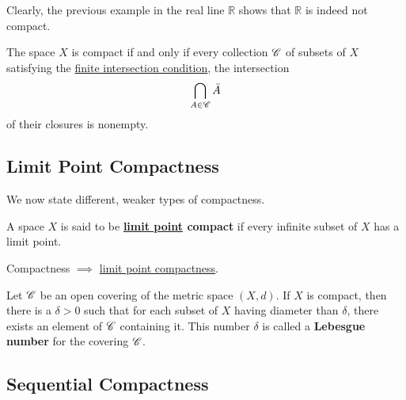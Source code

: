   Clearly, the previous example in the real line $\mathbb{R}$ shows that $\mathbb{R}$ is indeed not compact. 

  \begin{corollary}
    \label{thm:finite-intersection-property-for-arbitrary}
    The space $X$ is compact if and only if every collection $\operatorname{\mathscr{C}}$ of subsets of $X$ satisfying the \hyperref[def:finite-intersection-condition]{finite intersection condition}, the intersection 
    \begin{equation}
      \bigcap_{A \in \operatorname{\mathscr{C}}} \bar{A}
    \end{equation}
    of their closures is nonempty. 
  \end{corollary}

\subsection{Limit Point Compactness}

  We now state different, weaker types of compactness. 

  \begin{definition}
    \label{def:limit-point-compactness}
    A space $X$ is said to be \textbf{\hyperref[def:limit-point]{limit point} compact} if every infinite subset of $X$ has a limit point. 
  \end{definition}

  \begin{theorem}
    \label{thm:compactness-implies-limit-point-compactness}
    Compactness $\implies$ \hyperref[def:limit-point-compactness]{limit point compactness}.  
  \end{theorem}

  \begin{lemma}
    \label{thm:lebesgue-number-lemma}
    Let $\operatorname{\mathscr{C}}$ be an open covering of the metric space $(X, d)$. If $X$ is compact, then there is a $\delta > 0$ such that for each subset of $X$ having diameter than $\delta$, there exists an element of $\operatorname{\mathscr{C}}$ containing it. This number $\delta$ is called a \textbf{Lebesgue number} for the covering $\operatorname{\mathscr{C}}$. 
  \end{lemma}

\subsection{Sequential Compactness}

